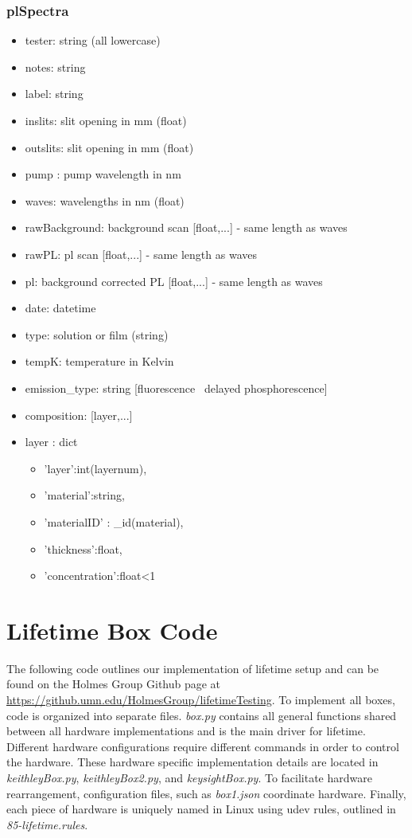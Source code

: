 \documentclass[../thesis.tex]{subfiles}
\begin{document}
\subsection{plSpectra}
\begin{itemize}
\item tester: string (all lowercase)
\item notes: string
\item label: string
\item inslits: slit opening in mm (float)
\item outslits: slit opening in mm (float)
\item pump : pump wavelength in nm
\item waves: wavelengths in nm (float)
\item rawBackground: background scan [float,...] - same length as waves
\item rawPL: pl scan [float,...] - same length as waves
\item pl: background corrected PL [float,...] - same length as waves
\item date: datetime
\item type: solution or film (string)
\item tempK: temperature in Kelvin
\item emission\_type: string [fluorescence \ delayed phosphorescence]
\item composition: [layer,...]
\item layer : dict

\begin{itemize}
\item 'layer':int(layernum),
\item 'material':string,
\item 'materialID' : \_id(material),
\item 'thickness':float,
\item 'concentration':float<1 

\end{itemize}
\end{itemize}



\chapter{Lifetime Box Code}\label{sec:lifetime_code}

The following code outlines our implementation of lifetime setup and can be found on the Holmes Group Github page at \url{https://github.umn.edu/HolmesGroup/lifetimeTesting}.
To implement all boxes, code is organized into separate files.
\textit{box.py} contains all general functions shared between all hardware implementations and is the main driver for lifetime.
Different hardware configurations require different commands in order to control the hardware.
These hardware specific implementation details are located in \textit{keithleyBox.py}, \textit{keithleyBox2.py}, and \textit{keysightBox.py}.
To facilitate hardware rearrangement, configuration files, such as \textit{box1.json} coordinate hardware.
Finally, each piece of hardware is uniquely named in Linux using udev rules, outlined in \textit{85-lifetime.rules}.
\end{document}
